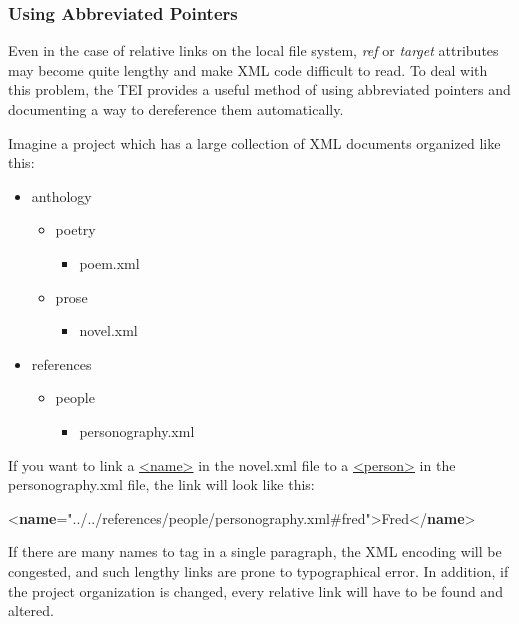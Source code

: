 \subsubsection[{Using Abbreviated Pointers}]{Using Abbreviated Pointers}\label{SAPU}\par
Even in the case of relative links on the local file system, {\itshape ref} or {\itshape target} attributes may become quite lengthy and make XML code difficult to read. To deal with this problem, the TEI provides a useful method of using abbreviated pointers and documenting a way to dereference them automatically.\par
Imagine a project which has a large collection of XML documents organized like this:\begin{itemize}
\item anthology \mbox{}\\[-10pt] \begin{itemize}
\item poetry \mbox{}\\[-10pt] \begin{itemize}
\item \textsf{poem.xml}
\end{itemize} 
\item prose \mbox{}\\[-10pt] \begin{itemize}
\item \textsf{novel.xml}
\end{itemize} 
\end{itemize} 
\item references \mbox{}\\[-10pt] \begin{itemize}
\item people \mbox{}\\[-10pt] \begin{itemize}
\item \textsf{personography.xml}
\end{itemize} 
\end{itemize} 
\end{itemize} \par
If you want to link a \hyperref[TEI.name]{<name>} in the \textsf{novel.xml} file to a \hyperref[TEI.person]{<person>} in the \textsf{personography.xml} file, the link will look like this: \par\bgroup{}\exampleFont \begin{shaded}\noindent\mbox{}{<\textbf{name}\hspace*{1em}{ref}="{../../references/people/personography.xml\#fred}">}Fred{</\textbf{name}>}\end{shaded}\egroup\par \noindent  If there are many names to tag in a single paragraph, the XML encoding will be congested, and such lengthy links are prone to typographical error. In addition, if the project organization is changed, every relative link will have to be found and altered.\par

